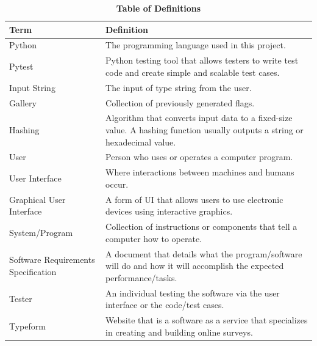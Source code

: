 \documentclass[12pt, titlepage]{article}
\newcommand{\newterm}[1]{\label{Term:#1} \MakeUppercase #1}
\begin{document}
\newpage
\begin{table}[htbp]
\caption{\textbf{Table of Definitions}} \label{def}

\begin{tabularx}{\textwidth}{p{3cm}X}
\toprule
\textbf{Term} & \textbf{Definition}\\
\midrule
    \newterm{Python} & The programming language used in this project.\\
    \hline
    \newterm{Pytest} & Python testing tool that allows testers to write test
    code and create simple and scalable test cases.\\
    \hline
    \newterm{Input String} & The input of type string from the user.\\
    \hline
    \newterm{Gallery} & Collection of previously generated flags.\\
    \hline
    \newterm{Hashing} & Algorithm that converts input data to a fixed-size
    value. A hashing function usually outputs a string or hexadecimal value.\\
    \hline
    \newterm{User} & Person who uses or operates a computer program.\\
    \hline
    \newterm{User Interface} & Where interactions between machines and humans
    occur.\\
    \hline
    \newterm{Graphical User Interface} & A form of UI that allows users to use
    electronic devices using interactive graphics.\\
    \hline
    \newterm{System/Program} & Collection of instructions or components that
    tell a computer how to operate.\\
    \hline
    \newterm{Software Requirements Specification} & A document that details
    what the program/software will do and how it will accomplish the expected
    performance/tasks.\\
    \hline
    \newterm{Tester} & An individual testing the software via the user
    interface or the code/test cases.\\
    \hline
    \newterm{Typeform} & Website that is a software as a service that
    specializes in creating and building online surveys.\\

\bottomrule
\end{tabularx}
    
\end{table} 

\newpage
\end{document}
